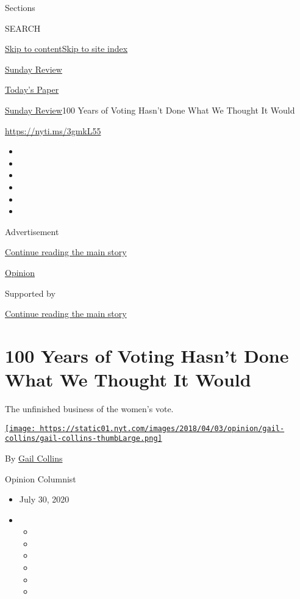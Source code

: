 Sections

SEARCH

\protect\hyperlink{site-content}{Skip to
content}\protect\hyperlink{site-index}{Skip to site index}

\href{https://www.nytimes.com/section/opinion/sunday}{Sunday Review}

\href{https://myaccount.nytimes.com/auth/login?response_type=cookie\&client_id=vi}{}

\href{https://www.nytimes.com/section/todayspaper}{Today's Paper}

\href{/section/opinion/sunday}{Sunday Review}\textbar{}100 Years of
Voting Hasn't Done What We Thought It Would

\url{https://nyti.ms/3gmkL55}

\begin{itemize}
\item
\item
\item
\item
\item
\item
\end{itemize}

Advertisement

\protect\hyperlink{after-top}{Continue reading the main story}

\href{/section/opinion}{Opinion}

Supported by

\protect\hyperlink{after-sponsor}{Continue reading the main story}

\hypertarget{100-years-of-voting-hasnt-done-what-we-thought-it-would}{%
\section{100 Years of Voting Hasn't Done What We Thought It
Would}\label{100-years-of-voting-hasnt-done-what-we-thought-it-would}}

The unfinished business of the women's vote.

\href{https://www.nytimes.com/by/gail-collins}{\texttt{[image: https://static01.nyt.com/images/2018/04/03/opinion/gail-collins/gail-collins-thumbLarge.png]}}

By \href{https://www.nytimes.com/by/gail-collins}{Gail Collins}

Opinion Columnist

\begin{itemize}
\item
  July 30, 2020
\item
  \begin{itemize}
  \item
  \item
  \item
  \item
  \item
  \item
  \end{itemize}
\end{itemize}

